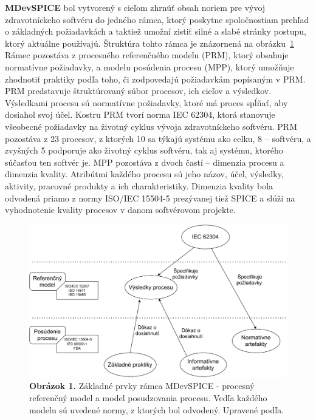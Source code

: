\documentclass[10pt,twoside,slovak,a4paper]{article}
\begin{document}
\textbf{MDevSPICE} bol vytvorený s cieľom zhrnúť obsah noriem pre vývoj zdravotníckeho softvéru do jedného rámca, ktorý poskytne spoločnostiam prehľad o základných požiadavkách a taktiež umožní zistiť silné a slabé stránky postupu, ktorý aktuálne používajú. Štruktúra tohto rámca je znázornená na obrázku~\ref{fig:med} Rámec pozostáva z procesného referenčného modelu (PRM), ktorý obsahuje normatívne požiadavky, a modelu posúdenia procesu (MPP), ktorý umožňuje zhodnotiť praktiky podľa toho, či zodpovedajú požiadavkám popísaným v PRM. PRM predstavuje štruktúrovaný súbor procesov, ich cieľov a výsledkov. Výsledkami procesu sú normatívne požiadavky, ktoré má proces spĺňať, aby dosiahol svoj účel. Kostru PRM tvorí norma IEC 62304, ktorá stanovuje všeobecné požiadavky na životný cyklus vývoja zdravotníckeho softvéru. PRM pozostáva z 23 procesov, z ktorých 10 sa týkajú systému ako celku, 8 – softvéru, a zvyšných 5 podporuje ako životný cyklus softvéru, tak aj systému, ktorého súčasťou ten softvér je. MPP pozostáva z dvoch častí – dimenzia procesu a dimenzia kvality. Atribútmi každého procesu sú jeho názov, účel, výsledky, aktivity, pracovné produkty a ich charakteristiky. Dimenzia kvality bola odvodená priamo z normy ISO/IEC 15504-5 prezývanej tiež SPICE a slúži na vyhodnotenie kvality procesov v danom softvérovom projekte\cite{ramecmd}.

\begin{figure}[h!]
\begin{center}
\includegraphics[scale=0.5]{obrazok1.pdf} %
\end{center}
\caption{\protect\textbf{Obrázok 1.} Základné prvky rámca MDevSPICE - procesný referenčný model a model posudzovania procesu. Vedľa každého modelu sú uvedené normy, z ktorých bol odvodený. Upravené podľa\protect\cite{ramecmd}.}
\label{fig:med}
\end{figure}
\medskip
\end{document}
